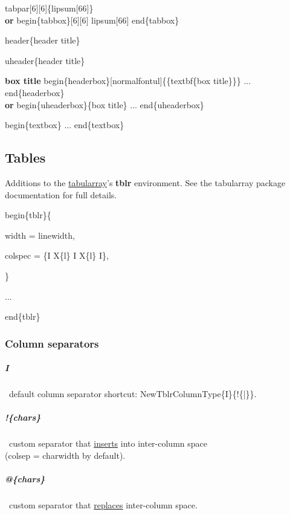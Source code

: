 \documentclass[english,12pt,openany,letterpaper]{book}
\begin{document}
\bs tabpar[6][6]\{\bs lipsum[66]\}
\\\textbf{or} \bs begin\{tabbox\}[6][6] \bs lipsum[66] \bs end\{tabbox\}

\tabpar[6][6]{\lipsum[66]}

\skipline


\bs header\{header title\}

\skipline


\bs uheader\{header title\}

\skipline

\begin{uheaderbox}{\textbf{box title}}
	\bs begin\{headerbox\}[\bs normalfont\bs ul]\{\{\bs textbf\{box title\}\}\} ... \bs end\{headerbox\}
	\\\textbf{or}
	\bs begin\{uheaderbox\}\{box title\} ... \bs end\{uheaderbox\}
\end{uheaderbox}

\begin{textbox}
	\bs begin\{textbox\} ... \bs end\{textbox\}
\end{textbox}

\break


\subsection{Tables}

Additions to the \href{https://ctan.org/pkg/tabularray}{tabularray}'s \textbf{tblr} environment. See the tabularray package documentation for full details.

\skipline

\bs begin\{tblr\}\{

\tab\tab width = \bs linewidth,

\tab\tab colspec = \{I X\{l\} I X\{l\} I\},

\tab \}

\tab ...

\bs end\{tblr\}

\skipline

\subsubsection{Column separators}

\subparagraph{I} \dash\ default column separator shortcut: {\bs NewTblrColumnType\{I\}\{!\{|\}\}}.
\subparagraph{!\{chars\}} \dash\ custom separator that \ul{inserts} into inter-column space\\
	\tab (\bs colsep = \bs charwidth by default).
\subparagraph{@\{chars\}} \dash\ custom separator that \ul{replaces} inter-column space.
\end{document}
